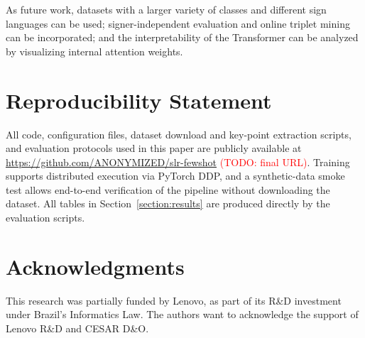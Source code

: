 \documentclass{article}
\begin{document}
As future work, datasets with a larger variety of classes and different sign languages can be used; signer-independent evaluation and online triplet mining can be incorporated; and the interpretability of the Transformer can be analyzed by visualizing internal attention weights.

\section*{Reproducibility Statement}
All code, configuration files, dataset download and key-point extraction scripts, and evaluation protocols used in this paper are publicly available at \url{https://github.com/ANONYMIZED/slr-fewshot} \textcolor{red}{(TODO: final URL)}. Training supports distributed execution via PyTorch DDP, and a synthetic-data smoke test allows end-to-end verification of the pipeline without downloading the dataset. All tables in Section~\ref{section:results} are produced directly by the evaluation scripts.

\section*{Acknowledgments}
This research was partially funded by Lenovo, as part of its R\&D investment under Brazil's Informatics Law. The authors want to acknowledge the support of Lenovo R\&D and CESAR D\&O.



\end{document}
